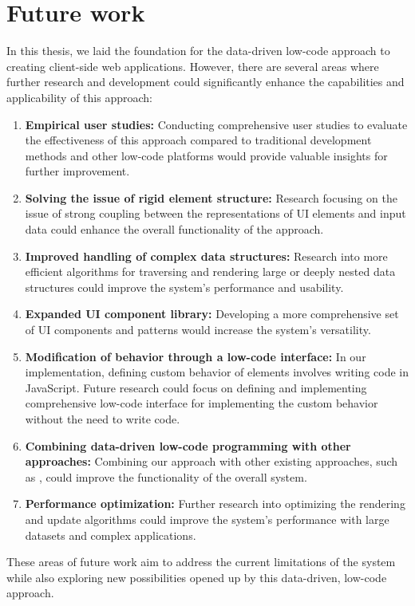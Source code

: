 \section{Future work}
In this thesis, we laid the foundation for the data-driven low-code approach to creating client-side web applications.
However, there are several areas where further research and development could significantly enhance the capabilities and applicability of this approach:
\begin{enumerate}
	\item \textbf{Empirical user studies:} Conducting comprehensive user studies to evaluate the effectiveness of this approach compared to traditional development methods and other low-code platforms would provide valuable insights for further improvement.
	\item \textbf{Solving the issue of rigid element structure:} Research focusing on the issue of strong coupling between the representations of UI elements and input data could enhance the overall functionality of the approach.
	\item \textbf{Improved handling of complex data structures:} Research into more efficient algorithms for traversing and rendering large or deeply nested data structures could improve the system's performance and usability.
	\item \textbf{Expanded UI component library:} Developing a more comprehensive set of UI components and patterns would increase the system's versatility.
	\item \textbf{Modification of behavior through a low-code interface:} In our implementation, defining custom behavior of elements involves writing code in JavaScript.
	      Future research could focus on defining and implementing comprehensive low-code interface for implementing the custom behavior without the need to write code.
	\item \textbf{Combining data-driven low-code programming with other approaches:} Combining our approach with other existing approaches, such as \citet{output-directed-programming}, could improve the functionality of the overall system.
	\item \textbf{Performance optimization:} Further research into optimizing the rendering and update algorithms could improve the system's performance with large datasets and complex applications.
\end{enumerate}
These areas of future work aim to address the current limitations of the system while also exploring new possibilities opened up by this data-driven, low-code approach.
